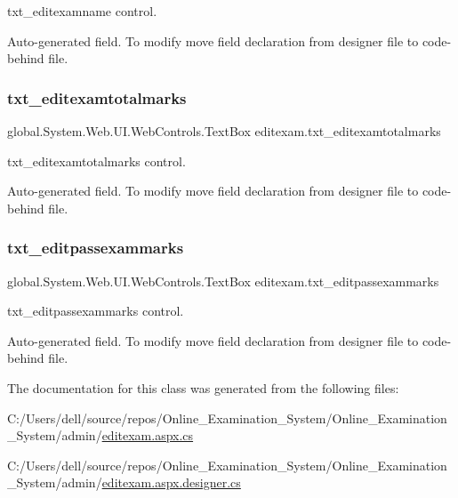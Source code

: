 txt\+\_\+editexamname control. 

Auto-\/generated field. To modify move field declaration from designer file to code-\/behind file. \mbox{\label{classeditexam_a6e3179c894b4f6e3d328f961ba3bf8f9}} 
\subsubsection{\texorpdfstring{txt\_editexamtotalmarks}{txt\_editexamtotalmarks}}
{\footnotesize\ttfamily global.\+System.\+Web.\+U\+I.\+Web\+Controls.\+Text\+Box editexam.\+txt\+\_\+editexamtotalmarks\hspace{0.3cm}{\ttfamily [protected]}}



txt\+\_\+editexamtotalmarks control. 

Auto-\/generated field. To modify move field declaration from designer file to code-\/behind file. \mbox{\label{classeditexam_a44a3c6f154ddd43edd9f9e9e610a611f}} 
\subsubsection{\texorpdfstring{txt\_editpassexammarks}{txt\_editpassexammarks}}
{\footnotesize\ttfamily global.\+System.\+Web.\+U\+I.\+Web\+Controls.\+Text\+Box editexam.\+txt\+\_\+editpassexammarks\hspace{0.3cm}{\ttfamily [protected]}}



txt\+\_\+editpassexammarks control. 

Auto-\/generated field. To modify move field declaration from designer file to code-\/behind file. 

The documentation for this class was generated from the following files\+:\begin{DoxyCompactItemize}
\item 
C\+:/\+Users/dell/source/repos/\+Online\+\_\+\+Examination\+\_\+\+System/\+Online\+\_\+\+Examination\+\_\+\+System/admin/\mbox{\hyperlink{editexam_8aspx_8cs}{editexam.\+aspx.\+cs}}\item 
C\+:/\+Users/dell/source/repos/\+Online\+\_\+\+Examination\+\_\+\+System/\+Online\+\_\+\+Examination\+\_\+\+System/admin/\mbox{\hyperlink{editexam_8aspx_8designer_8cs}{editexam.\+aspx.\+designer.\+cs}}\end{DoxyCompactItemize}
